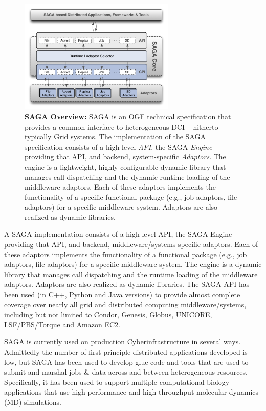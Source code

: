 \documentclass[]{svjour3}
\begin{document}
\begin{figure}[t]
\centering \includegraphics[width=0.66\textwidth]{figures/saga-architecture-1.png}
\caption{\textbf{SAGA Overview: } SAGA is an OGF technical
 specification that provides a common interface to heterogeneous DCI
 -- hitherto typically Grid systems. The implementation of the
 SAGA\cite{saga_url} specification consists of a high-level {\it
  API}, the SAGA {\it Engine} providing that API, and backend,
 system-specific {\it Adaptors}. The engine is a lightweight,
 highly-configurable dynamic library that manages call dispatching
 and the dynamic runtime loading of the middleware adaptors. Each of
 these adaptors implements the functionality of a specific functional
 package (e.g., job adaptors, file adaptors) for a specific
 middleware system. Adaptors are also realized as dynamic libraries.}
 \label{fig:saga-overview}
\end{figure}

A SAGA implementation consists of a high-level API, the SAGA
Engine providing that API, and backend, middleware/systems specific
adaptors. Each of these adaptors implements the functionality of
a functional package (e.g., job adaptors, file adaptors) for a
specific middleware system. The engine is a dynamic library that
manages call dispatching and the runtime loading of the middleware
adaptors. Adaptors are also realized as dynamic libraries. The SAGA
API has been used (in C++, Python and Java versions) to provide almost
complete coverage over nearly all grid and distributed computing
middleware/systems, including but not limited to Condor, Genesis,
Globus, UNICORE, LSF/PBS/Torque and Amazon EC2.

SAGA is currently used on production Cyberinfrastructure in several ways.
Admittedly the number of first-principle distributed applications developed is
low, but SAGA has been used to develop glue-code and tools that are
used to submit and marshal jobs \& data across and between
heterogeneous resources. Specifically, it has been used to support
multiple computational biology applications that use high-performance
and high-throughput molecular dynamics (MD) simulations.
\end{document}
